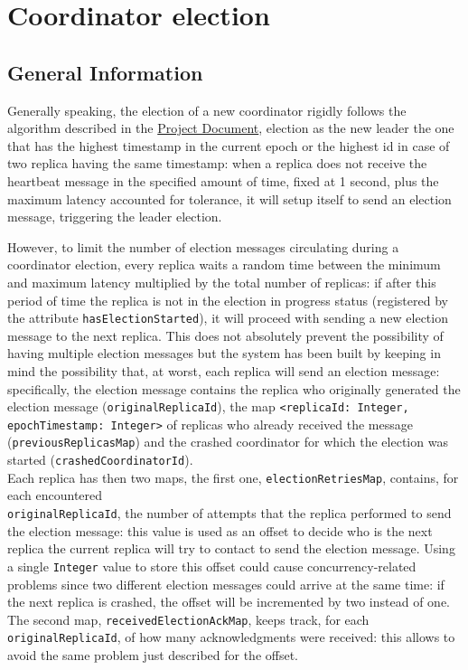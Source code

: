 \newpage
\section{Coordinator election}

\subsection{General Information}

Generally speaking, the election of a new coordinator rigidly follows the algorithm described in the \href{https://didatticaonline.unitn.it/dol/pluginfile.php/2046075/mod_folder/content/0/ds1_project_2026_v3.20260625.pdf?forcedownload=1}{Project Document}, election as the new leader the one that has the highest timestamp in the current epoch or the highest id in case of two replica having the same timestamp: when a replica does not receive the heartbeat message in the specified amount of time, fixed at 1 second, plus the maximum latency accounted for tolerance, it will setup itself to send an election message, triggering the leader election.

However, to limit the number of election messages circulating during a coordinator election, every replica waits a random time between the minimum and maximum latency multiplied by the total number of replicas: if after this period of time the replica is not in the election in progress status (registered by the attribute \texttt{hasElectionStarted}), it will proceed with sending a new election message to the next replica. This does not absolutely prevent the possibility of having multiple election messages but the system has been built by keeping in mind the possibility that, at worst, each replica will send an election message: specifically, the election message contains the replica who originally generated the election message (\texttt{originalReplicaId}), the map \texttt{<replicaId: Integer, epochTimestamp: Integer>} of replicas who already received the message (\texttt{previousReplicasMap}) and the crashed coordinator for which the election was started (\texttt{crashedCoordinatorId}).\\
Each replica has then two maps, the first one, \texttt{electionRetriesMap}, contains, for each encountered \\ \texttt{originalReplicaId}, the number of attempts that the replica performed to send the election message: this value is used as an offset to decide who is the next replica the current replica will try to contact to send the election message. Using a single \texttt{Integer} value to store this offset could cause concurrency-related problems since two different election messages could arrive at the same time: if the next replica is crashed, the offset will be incremented by two instead of one.\\
The second map, \texttt{receivedElectionAckMap}, keeps track, for each \texttt{originalReplicaId}, of how many acknowledgments were received: this allows to avoid the same problem just described for the offset.

